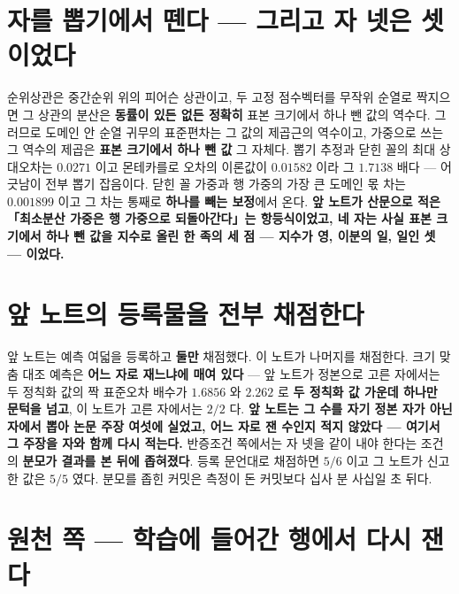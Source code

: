 \section{자를 뽑기에서 뗀다 --- 그리고 자 넷은 셋이었다}


순위상관은 중간순위 위의 피어슨 상관이고, 두 고정 점수벡터를 무작위 순열로 짝지으면 그 상관의 분산은 \textbf{동률이 있든 없든 정확히} 표본 크기에서 하나 뺀 값의 역수다. 그러므로 도메인 안 순열 귀무의 표준편차는 그 값의 제곱근의 역수이고, 가중으로 쓰는 그 역수의 제곱은 \textbf{표본 크기에서 하나 뺀 값} 그 자체다. 뽑기 추정과 닫힌 꼴의 최대 상대오차는 $0.0271$ 이고 몬테카를로 오차의 이론값이 $0.01582$ 이라 그 $1.7138$ 배다 --- 어긋남이 전부 뽑기 잡음이다. 닫힌 꼴 가중과 행 가중의 가장 큰 도메인 몫 차는 $0.001899$ 이고 그 차는 통째로 \textbf{하나를 빼는 보정}에서 온다. \textbf{앞 노트가 산문으로 적은 「최소분산 가중은 행 가중으로 되돌아간다」는 항등식이었고, 네 자는 사실 표본 크기에서 하나 뺀 값을 지수로 올린 한 족의 세 점 --- 지수가 영, 이분의 일, 일인 셋 --- 이었다.}

\section{앞 노트의 등록물을 전부 채점한다}


앞 노트는 예측 여덟을 등록하고 \textbf{둘만} 채점했다. 이 노트가 나머지를 채점한다. 크기 맞춤 대조 예측은 \textbf{어느 자로 재느냐에 매여 있다} --- 앞 노트가 정본으로 고른 자에서는 두 정칙화 값의 짝 표준오차 배수가 $1.6856$ 와 $2.262$ 로 \textbf{두 정칙화 값 가운데 하나만 문턱을 넘고}, 이 노트가 고른 자에서는 $2 / 2$ 다. \textbf{앞 노트는 그 수를 자기 정본 자가 아닌 자에서 뽑아 논문 주장 여섯에 실었고, 어느 자로 잰 수인지 적지 않았다 --- 여기서 그 주장을 자와 함께 다시 적는다.} 반증조건 쪽에서는 자 넷을 같이 내야 한다는 조건의 \textbf{분모가 결과를 본 뒤에 좁혀졌다}. 등록 문언대로 채점하면 $5 / 6$ 이고 그 노트가 신고한 값은 $5 / 5$ 였다. 분모를 좁힌 커밋은 측정이 돈 커밋보다 십사 분 사십일 초 뒤다.

\section{원천 쪽 --- 학습에 들어간 행에서 다시 잰다}

